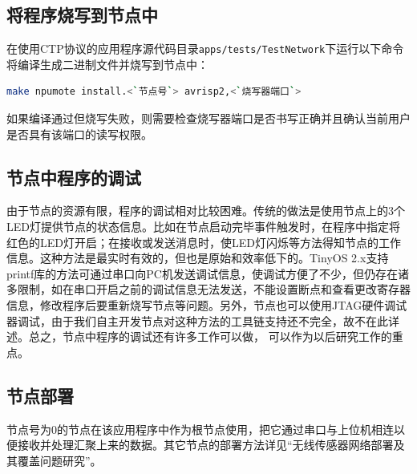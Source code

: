 \subsection{将程序烧写到节点中}
在使用CTP协议的应用程序源代码目录\texttt{apps/tests/TestNetwork}下运行以下命令将编译生成二进制文件并烧写到节点中：
\begin{lstlisting}[language=bash,numbers=none]
    make npumote install.<`节点号`> avrisp2,<`烧写器端口`>
\end{lstlisting}
如果编译通过但烧写失败，则需要检查烧写器端口是否书写正确并且确认当前用户是否具有该端口的读写权限。

\subsection{节点中程序的调试}
由于节点的资源有限，程序的调试相对比较困难。传统的做法是使用节点上的3个LED灯提供节点的状态信息。比如在节点启动完毕事件触发时，在程序中指定将红色的LED灯开启；在接收或发送消息时，使LED灯闪烁等方法得知节点的工作信息。这种方法是最实时有效的，但也是原始和效率低下的。TinyOS 2.x支持printf库的方法可通过串口向PC机发送调试信息，使调试方便了不少，但仍存在诸多限制，如在串口开启之前的调试信息无法发送，不能设置断点和查看更改寄存器信息，修改程序后要重新烧写节点等问题。另外，节点也可以使用JTAG硬件调试器调试，由于我们自主开发节点对这种方法的工具链支持还不完全，故不在此详述。总之，节点中程序的调试还有许多工作可以做，
可以作为以后研究工作的重点。

\subsection{节点部署}
节点号为0的节点在该应用程序中作为根节点使用，把它通过串口与上位机相连以便接收并处理汇聚上来的数据。其它节点的部署方法详见“无线传感器网络部署及其覆盖问题研究”。
